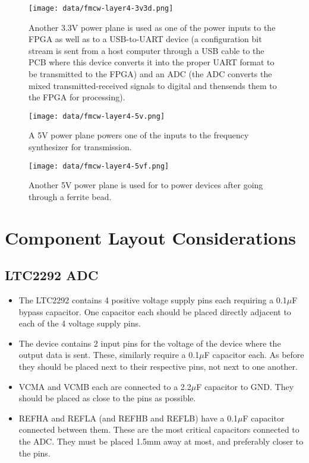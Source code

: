 \documentclass{default}
\begin{document}
\begin{figure}[h]
  \centering\texttt{[image: data/fmcw-layer4-3v3d.png]}
  \caption{Another 3.3V power plane is used as one of the power inputs to the FPGA as well as to a
    USB-to-UART device (a configuration bit stream is sent from a host computer through a USB cable
    to the PCB where this device converts it into the proper UART format to be transmitted to
    the FPGA) and an ADC (the ADC converts the mixed transmitted-received signals to digital and
    thensends them to the FPGA for processing).}
  \label{fig:fmcw-layer4-3v3d}
\end{figure}

\begin{figure}[h]
  \centering\texttt{[image: data/fmcw-layer4-5v.png]}
  \caption{A 5V power plane powers one of the inputs to the frequency synthesizer for transmission.}
  \label{fig:fmcw-layer4-5v}
\end{figure}

\begin{figure}[h]
  \centering\texttt{[image: data/fmcw-layer4-5vf.png]}
  \caption{Another 5V power plane is used for to power devices after going through a ferrite bead.}
  \label{fig:fmcw-layer4-5vf}
\end{figure}

\section{Component Layout Considerations}
\subsection{LTC2292 ADC}

\begin{itemize}
\item The LTC2292 contains 4 positive voltage supply pins each requiring a 0.1$\mu$F bypass
  capacitor. One capacitor each should be placed directly adjacent to each of the 4 voltage supply
  pins.
\item The device contains 2 input pins for the voltage of the device where the output data
  is sent. These, similarly require a 0.1$\mu$F capacitor each. As before they should be placed next
  to their respective pins, not next to one another.
\item VCMA and VCMB each are connected to a 2.2$\mu$F capacitor to GND. They should be placed
  as close to the pins as possible.
\item REFHA and REFLA (and REFHB and REFLB) have a 0.1$\mu$F capacitor connected between
  them. These are the most critical capacitors connected to the ADC. They must be placed 1.5mm away
  at most, and preferably closer to the pins.
\end{itemize}
\end{document}
